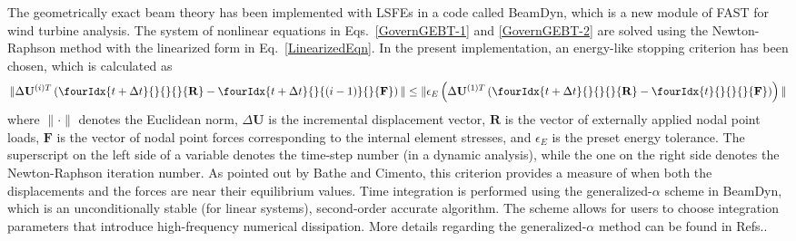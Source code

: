 The geometrically exact beam theory has been implemented with LSFEs in a
code called BeamDyn, which is a new module of FAST for wind turbine analysis. The system of nonlinear
equations in Eqs.~\eqref{GovernGEBT-1} and \eqref{GovernGEBT-2} are solved
using the Newton-Raphson method with the linearized form in
Eq.~\eqref{LinearizedEqn}. 
In the present
implementation, an energy-like stopping criterion has been chosen, which is calculated as
\begin{equation}
    \label{StoppingCriterion}
    \| \Delta \mathbf{U}^{(i)T} \left( \fourIdx{t+\Delta t}{}{}{}{\mathbf{R}} -  \fourIdx{t+\Delta t}{}{(i-1)}{}{\mathbf{F}}  \right) \| \leq \| \epsilon_E \left( \Delta \mathbf{U}^{(1)T} \left( \fourIdx{t+\Delta t}{}{}{}{\mathbf{R}} - \fourIdx{t}{}{}{}{\mathbf{F}} \right) \right) \|
\end{equation}
where $\|\cdot\|$ denotes the Euclidean norm, $\Delta \mathbf{U}$ is the
incremental displacement vector, $\mathbf{R}$ is the vector of externally
applied nodal point loads, $\mathbf{F}$ is the vector of nodal point forces
corresponding to the internal element stresses, and $\epsilon_E$ is the
preset energy tolerance. The superscript on the left side of a variable
denotes the time-step number (in a dynamic analysis), while the one on the
right side denotes the Newton-Raphson iteration number. As pointed out by
Bathe and Cimento\cite{Bathe-Cimento:1980}, this criterion provides
a measure of when both the displacements and the forces are near their
equilibrium values. Time integration is performed using the
generalized-$\alpha$ scheme in BeamDyn, which is an unconditionally stable
(for linear systems),
second-order accurate algorithm.  The scheme allows for users to choose
integration parameters that introduce high-frequency numerical dissipation.
More details
regarding the generalized-$\alpha$ method can be found in
Refs.\cite{Chung-Hulbert:1993,Bauchau:2010}. 

